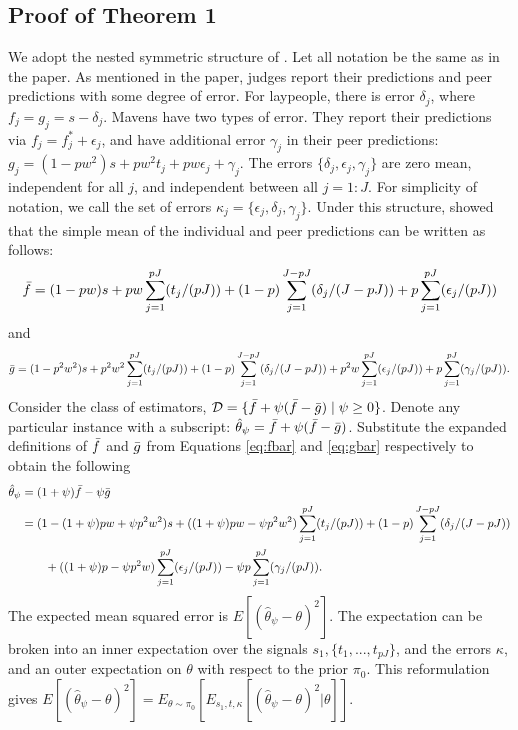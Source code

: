 \begin{appendix}
\section{Proof of Theorem 1}
\label{sec:thm1}
We adopt the nested symmetric structure of \cite{mp}. Let all notation be the same as in the paper. As mentioned in the paper, judges report their predictions and peer predictions with some degree of error. For laypeople, there is error $\delta_j$, where $f_j = g_j = s - \delta_j$. Mavens have two types of error. They report their predictions via $f_j = f_j^* + \epsilon_j$, and have additional error $\gamma_j$ in their peer predictions: $g_j = (1-pw^2)s + pw^2t_j + pw\epsilon_j + \gamma_j$. The errors $\{\delta_j, \epsilon_j, \gamma_j\}$ are zero mean, independent for all $j$, and independent between all $j= 1:J$. For simplicity of notation, we call the set of errors $\kappa_j = \{\epsilon_j, \delta_j, \gamma_j\}$. Under this structure, \citeauthor{mp} showed that the simple mean of the individual and peer predictions can be written as follows:
\begin{equation}
    \Bar{f} = (1-pw)s + pw\sum_{j=1}^{pJ}(t_j/(pJ)) + (1-p)\sum_{j=1}^{J-pJ}(\delta_j/(J-pJ))+ p\sum_{j=1}^{pJ}(\epsilon_j/(pJ))
    \label{eq:fbar}
\end{equation}
and 
\begin{equation}
    \Bar{g} = (1-p^2w^2)s + p^2w^2\sum_{j=1}^{pJ}(t_j/(pJ)) +(1-p)\sum_{j=1}^{J-pJ}(\delta_j/(J-pJ))+ p^2w\sum_{j=1}^{pJ}(\epsilon_j/(pJ)) + p\sum_{j=1}^{pJ}(\gamma_j/(pJ) ).
    \label{eq:gbar}
\end{equation}
Consider the class of estimators, $\mathcal{D}  = \{\Bar{f} + \psi(\Bar{f}-\Bar{g})\mid \psi \geq 0\}$. Denote any particular instance with a subscript: $\hat{\theta}_{\psi} = \Bar{f} + \psi(\Bar{f}-\Bar{g})$. Substitute the expanded definitions of $\Bar{f}$ and $\Bar{g}$ from Equations \ref{eq:fbar} and \ref{eq:gbar} respectively to obtain the following
\begin{align*}
    \hat{\theta}_{\psi} &= (1+\psi)\Bar{f} - \psi\Bar{g} \\
    &= (1 -(1+\psi)pw  + \psi p^2w^2)s + ((1+\psi)pw - \psi p^2w^2)\sum_{j=1}^{pJ}(t_j/(pJ)) + (1-p)\sum_{j=1}^{J-pJ}(\delta_j/(J-pJ)) \\
    &\quad \quad + ((1+\psi)p-\psi p^2w)\sum_{j=1}^{pJ}(\epsilon_j/(pJ)) -\psi p\sum_{j=1}^{pJ}(\gamma_j/(pJ) ). 
\end{align*}
The expected mean squared error is $E[(\hat{\theta}_{\psi}- \theta)^2]$. The expectation can be broken into an inner expectation over the signals $s_1, \{t_1,...,t_{pJ}\}$, and the errors $\kappa$, and an outer expectation on $\theta$ with respect to the prior $\pi_0$. This reformulation gives $E[(\hat{\theta}_{\psi} - \theta)^2] = E_{\theta \sim \pi_0}[E_{s_1,t, \kappa}[(\hat{\theta}_{\psi} - \theta)^2|\theta]]$. 

\end{appendix}
